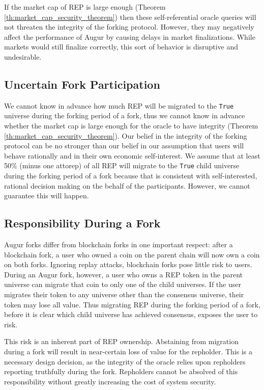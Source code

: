 \documentclass[floatfix,reprint,nofootinbib,amsmath,amssymb,epsfig,pre,floats,letterpaper,groupedaffiliation]{revtex4-1}
\theoremstyle{definition}
\theoremstyle{definition}
\begin{document}
If the market cap of REP is large enough (Theorem \ref{th:market_cap_security_theorem}) then these self-referential oracle queries will not threaten the integrity of the forking protocol.  However, they may negatively affect the performance of Augur by causing delays in market finalizations.  While markets would still finalize correctly, this sort of behavior is disruptive and undesirable.

\subsection{Uncertain Fork Participation}\label{subsection:uncertain_fork_participation}

We cannot know in advance how much REP will be migrated to the \texttt{True} universe during the forking period of a fork, thus we cannot know in advance whether the market cap is large enough for the oracle to have integrity (Theorem \ref{th:market_cap_security_theorem}).  Our belief in the integrity of the forking protocol can be no stronger than our belief in our assumption that users will behave rationally and in their own economic self-interest. We assume that at least 50\% (minus one attorep) of all REP will migrate to the \texttt{True} child universe during the forking period of a fork because that is consistent with self-interested, rational decision making on the behalf of the participants. However, we cannot guarantee this will happen.

\subsection{Responsibility During a Fork}
Augur forks differ from blockchain forks in one important respect: after a blockchain fork, a user who owned a coin on the parent chain will now own a coin on both forks.  Ignoring replay attacks, blockchain forks pose little risk to users.  During an Augur fork, however, a user who owns a REP token in the parent universe can migrate that coin to only one of the child universes.  If the user migrates their token to any universe other than the consensus universe, their token may lose all value.  Thus migrating REP during the forking period of a fork, before it is clear which child universe has achieved consensus, exposes the user to risk.

This risk is an inherent part of REP ownership. Abstaining from migration during a fork will result in near-certain loss of value for the repholder. This is a necessary design decision, as the integrity of the oracle relies upon repholders reporting truthfully during the fork. Repholders cannot be absolved of this responsibility without greatly increasing the cost of system security.
\end{document}
